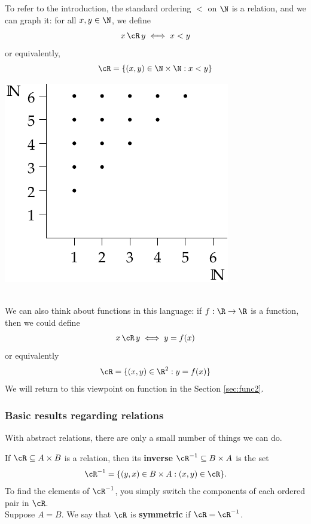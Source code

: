 \noindent\begin{minipage}{0.6\textwidth}
To refer to the introduction, the standard ordering $<$ on $\N$ is a relation, and we can graph it: for all $x,y\in\N$, we define
\[x\,\cR\,y\iff x<y\]
or equivalently,
\[\cR=\{(x,y)\in\N\times\N:x<y\}\]
\vspace*{10pt}
\end{minipage}\hfill\begin{minipage}{0.3\textwidth}
\includegraphics[width=\textwidth]{relations-25-less}
\end{minipage}\\
We can also think about functions in this language: if $f:\R\to\R$ is a function, then we could define
\[x\,\cR\,y\iff y=f(x)\]
or equivalently
\[\cR=\{(x,y)\in\R^2:y=f(x)\}\]
We will return to this viewpoint on function in the Section \ref{sec:func2}.

\subsubsection*{Basic results regarding relations}

With abstract relations, there are only a small number of things we can do.

\begin{defn}\label{defn:relnsym}
If $\cR\subseteq A\times B$ is a relation, then its \textbf{inverse} $\cR^{-1}\subseteq B\times A$ is the set
\[\cR^{-1}=\{(y,x)\in B\times A:(x,y)\in\cR\}.\]
To find the elements of $\cR^{-1}$, you simply switch the components of each ordered pair in $\cR$.\\
Suppose $A=B$. We say that $\cR$ is \textbf{symmetric} if $\cR=\cR^{-1}$.
\end{defn}\pagebreak[1]

